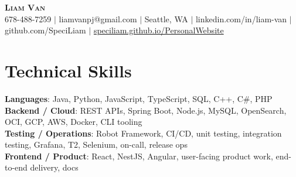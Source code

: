 \documentclass[letterpaper,11pt]{article}
\begin{document}

%
\begin{center}
    \textbf{\Huge \scshape Liam Van} \\ \vspace{1pt}
    \small 678-488-7259 $|$ \small {liamvanpj@gmail.com} $|$ Seattle, WA
 {{$|$ linkedin.com/in/liam-van} {$|$ github.com/SpeciLiam} {$|$ \href{https://speciliam.github.io/PersonalWebsite}{speciliam.github.io/PersonalWebsite}}}

\end{center}

\section{Technical Skills}
 \begin{itemize}[leftmargin=0.15in, label={}]
    \small{\item{
     \textbf{Languages}{: Java, Python, JavaScript, TypeScript, SQL, C++, C\#, PHP} \\
     \textbf{Backend / Cloud}{: REST APIs, Spring Boot, Node.js, MySQL, OpenSearch, OCI, GCP, AWS, Docker, CLI tooling} \\
     \textbf{Testing / Operations}{: Robot Framework, CI/CD, unit testing, integration testing, Grafana, T2, Selenium, on-call, release ops} \\
     \textbf{Frontend / Product}{: React, NestJS, Angular, user-facing product work, end-to-end delivery, docs} \\
    }}
 \end{itemize}
%
\end{document}
